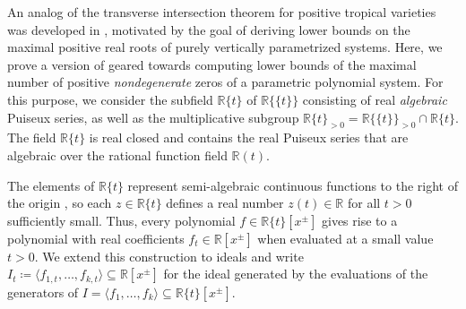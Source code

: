 \documentclass[11pt,reqno,a4paper]{amsart}
\numberwithin{equation}{section}
\theoremstyle{theoremstyle}
\theoremstyle{examplestyle}
\newcommand{\RR}{\mathbb{R}}
\newcommand{\RRt}{\mathbb{R}\{\!\{t\}\!\}}
\begin{document}
An analog of the transverse intersection theorem for positive tropical varieties was developed in \cite[Theorem 4.11]{RoseTelek24}, motivated by the goal of deriving lower bounds on the maximal positive real roots of purely vertically parametrized systems. Here, we prove a version of \cite[Corollary 5.5]{RoseTelek24} geared towards computing lower bounds of the maximal number of positive \emph{nondegenerate} zeros of a parametric polynomial system.
For this purpose, we consider the subfield $\RR\{t\}$ of   $\RRt$ consisting of real \emph{algebraic} Puiseux series, as well as the multiplicative subgroup $\RR\{t\}_{>0} =\RRt_{>0} \cap \RR\{t \}$. The field  $\mathbb{R}\{t\}$ is  real closed and contains the real Puiseux series that are algebraic over the rational function field $\mathbb{R}(t)$.

The elements of $\mathbb{R}\{t\}$ represent semi-algebraic continuous functions to the right of the origin \cite[Theorem~3.14]{BasuPollackRoy}, so each $z \in \mathbb{R}\{t\}$ defines a real number $z(t) \in \mathbb{R}$ for all $t>0$ sufficiently small.
Thus, every  polynomial $f \in \mathbb{R}\{t\}[x^\pm]$ gives rise to a polynomial with real coefficients $f_t \in \mathbb{R}[x^\pm]$ when evaluated at a small value $t>0$. We extend this construction to ideals and write $I_t \coloneqq \langle f_{1,t}, \dots , f_{k,t} \rangle \subseteq \mathbb{R}[x^\pm]$ for the ideal generated by the evaluations of the generators of $I = \langle f_{1}, \dots , f_{k} \rangle \subseteq  \mathbb{R}\{t\}[x^\pm]$.
\end{document}

